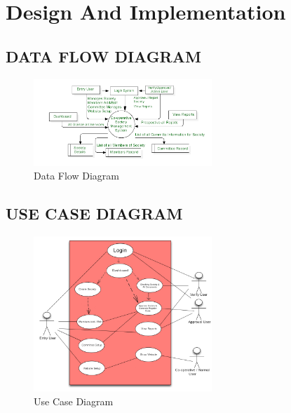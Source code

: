 \chapter*{Design And Implementation}

\section{DATA FLOW DIAGRAM}
\begin{figure}[h]
  \centering
  \includegraphics[width=0.6\textwidth]{Chap3/1.jpg}
  \caption{Data Flow Diagram}
  \label{fig:example}
\end{figure}

\section{USE CASE DIAGRAM}
\begin{figure}[h]
  \centering
  \includegraphics[width=0.6\textwidth]{Chap3/2.jpg}
  \caption{Use Case Diagram}
  \label{fig:example}
\end{figure}

